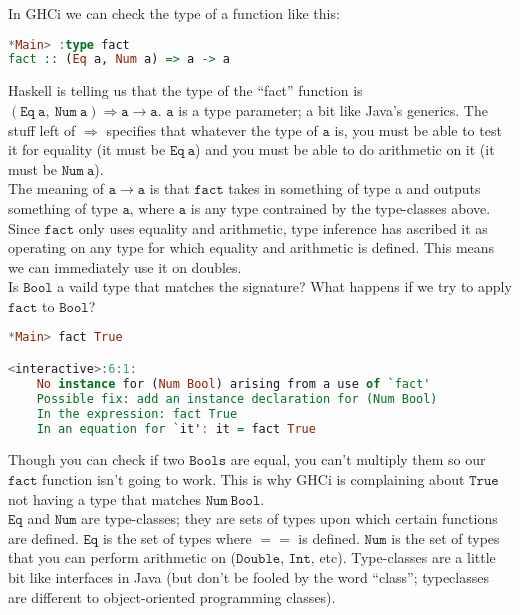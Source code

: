 \documentclass[a4paper,12pt]{article}
\newcommand{\keywadj}[1]{\mathtt{#1}}
\begin{document}
\noindent
In GHCi we can check the type of a function like this:

\begin{lstlisting}[language=Haskell]
*Main> :type fact
fact :: (Eq a, Num a) => a -> a
\end{lstlisting}

\noindent
Haskell is telling us that the type of the ``fact'' function is $\keywadj{(Eq~a,~Num~a) \Rightarrow a \rightarrow a}$. $\keywadj{a}$ is a type parameter; a bit like Java's generics. The stuff left of $\keywadj{\Rightarrow}$ specifies that whatever the type of $\keywadj{a}$ is, you must be able to test it for equality (it must be $\keywadj{Eq~ a}$) and you must be able to do arithmetic on it (it must be $\keywadj{Num~ a}$). \\

\noindent
The meaning of $\keywadj{a \rightarrow a}$ is that $\keywadj{fact}$ takes in something of type a and outputs something of type $\keywadj{a}$, where $\keywadj{a}$ is any type contrained by the type-classes above. \\

\noindent
Since $\keywadj{fact}$ only uses equality and arithmetic, type inference has ascribed it as operating on any type for which equality and arithmetic is defined. This means we can immediately use it on doubles. \\

\noindent
Is $\keywadj{Bool}$ a vaild type that matches the signature? What happens if we try to apply $\keywadj{fact}$ to $\keywadj{Bool}$?

\begin{lstlisting}[language=Haskell]
*Main> fact True

<interactive>:6:1:
    No instance for (Num Bool) arising from a use of `fact'
    Possible fix: add an instance declaration for (Num Bool)
    In the expression: fact True
    In an equation for `it': it = fact True
\end{lstlisting}

\noindent
Though you can check if two $\keywadj{Bools}$ are equal, you can't multiply them so our $\keywadj{fact}$ function isn't going to work. This is why GHCi is complaining about $\keywadj{True}$ not having a type that matches $\keywadj{Num~Bool}$. \\

\noindent
 $\keywadj{Eq}$ and $\keywadj{Num}$ are type-classes; they are sets of types upon which certain functions are defined. $\keywadj{Eq}$ is the set of types where $==$ is defined. $\keywadj{Num}$ is the set of types that you can perform arithmetic on ($\keywadj{Double}$, $\keywadj{Int}$, etc). Type-classes are a little bit like interfaces in Java (but don't be fooled by the word ``class''; typeclasses are different to object-oriented programming classes). \\
\end{document}
